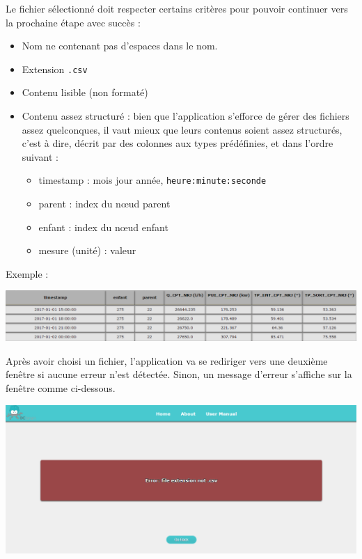 		Le fichier sélectionné doit respecter certains critères pour pouvoir continuer vers la prochaine étape avec succès :
		\begin{itemize}
			\item Nom ne contenant pas d'espaces dans le nom.
			\item Extension \lstinline!.csv!
			\item Contenu lisible (non formaté)
			\item Contenu assez structuré : bien que l'application s'efforce de gérer des fichiers assez quelconques, il vaut mieux que leurs contenus soient assez structurés, c'est à dire, décrit par des colonnes aux types prédéfinies, et dans l'ordre suivant :
			\begin{itemize}
				\item timestamp : mois jour année, \lstinline!heure:minute:seconde!
				\item parent : index du nœud parent
				\item enfant : index du nœud enfant
				\item mesure (unité) : valeur
			\end{itemize}
		\end{itemize}
		Exemple :
		\begin{center}\includegraphics[scale=0.52]{exampleCSV.png}\end{center}
		
		Après avoir choisi un fichier, l'application va se rediriger vers une deuxième fenêtre si aucune erreur n'est détectée. Sinon, un message d'erreur s'affiche sur la fenêtre comme ci-dessous.
		
				
		\begin{center}\includegraphics[scale=0.45]{fenetreErreur.png}\end{center}
			
